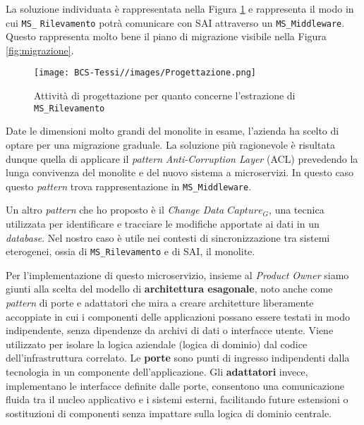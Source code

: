         \vspace{0.2 em}
        \noindent La soluzione individuata è rappresentata nella Figura \ref{fig:progettazione} e rappresenta il modo in cui \texttt{MS\_} \texttt{Rilevamento} potrà comunicare con SAI attraverso un \texttt{MS\_Middleware}. Questo rappresenta molto bene il piano di migrazione visibile nella Figura \ref{fig:migrazione}.
        
        \begin{figure}
            \centering
            \texttt{[image: BCS-Tessi//images/Progettazione.png]}
            \caption[Progettazione per l'estrazione del microservizio]{Attività di progettazione per quanto concerne l'estrazione di \texttt{MS\_Rilevamento}}
            \label{fig:progettazione}
        \end{figure}

        \vspace{0.2 em}
        \noindent Date le dimensioni molto grandi del monolite in esame, l'azienda ha scelto di optare per una migrazione graduale. La soluzione più ragionevole è risultata dunque quella di applicare il \textit{pattern} \textit{Anti-Corruption Layer} (ACL) prevedendo la lunga convivenza del monolite e del nuovo sistema a microservizi. In questo caso questo \textit{pattern} trova rappresentazione in \texttt{MS\_Middleware}.

        \vspace{0.2 em}
        \noindent Un altro \textit{pattern} che ho proposto è il \textit{Change Data $Capture_G$}, una tecnica utilizzata per identificare e tracciare le modifiche apportate ai dati in un \textit{database}. Nel nostro caso è utile nei contesti di sincronizzazione tra sistemi eterogenei, ossia di \texttt{MS\_Rilevamento} e di SAI, il monolite. 

        \vspace{0.2em}
        \noindent Per l'implementazione di questo microservizio, insieme al \textit{Product Owner} siamo giunti alla scelta del modello di \textbf{architettura esagonale}, noto anche come \textit{pattern} di porte e adattatori che mira a creare architetture liberamente accoppiate in cui i componenti delle applicazioni possano essere testati in modo indipendente, senza dipendenze da archivi di dati o interfacce utente. Viene utilizzato per isolare la logica aziendale (logica di dominio) dal codice dell'infrastruttura correlato. Le \textbf{porte} sono punti di ingresso indipendenti dalla tecnologia in un componente dell'applicazione. Gli \textbf{adattatori} invece, implementano le interfacce definite dalle porte, consentono una comunicazione fluida tra il nucleo applicativo e i sistemi esterni, facilitando future estensioni o sostituzioni di componenti senza impattare sulla logica di dominio centrale.

